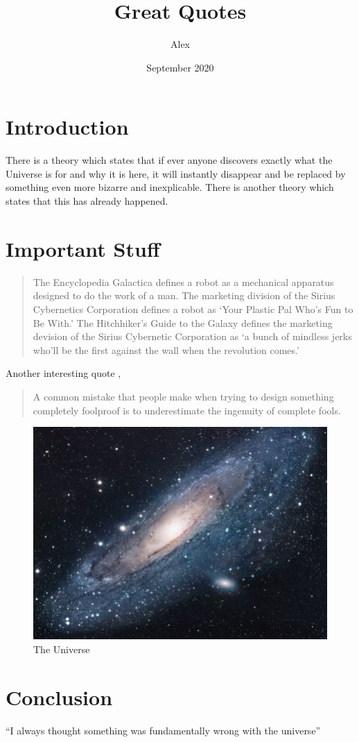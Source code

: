 \documentclass{article}
\title{Great Quotes}
\author{Alex}
\date{September 2020}
\begin{document}
\maketitle

\section{Introduction}
There is a theory which states that if ever anyone discovers exactly what the Universe is for and why it is here, it will instantly disappear and be replaced by something even more bizarre and inexplicable.
There is another theory which states that this has already happened.

\section{Important Stuff}

\begin{quote}
The Encyclopedia Galactica defines a robot as a mechanical apparatus designed to do the work of a man. The marketing division of the Sirius Cybernetics Corporation defines a robot as `Your Plastic Pal Who's Fun to Be With.' The Hitchhiker's Guide to the Galaxy defines the marketing devision of the Sirius Cybernetic Corporation as `a bunch of mindless jerks who'll be the first against the wall when the revolution comes.'
\end{quote}

Another interesting quote \cite{adams2009mostly},
\begin{quote}
A common mistake that people make when trying to design something completely foolproof is to underestimate the ingenuity of complete fools.
\end{quote}

\begin{figure}[h!]
\centering
\includegraphics[scale=1.7]{universe}
\caption{The Universe}
\label{fig:universe}
\end{figure}

\section{Conclusion}
``I always thought something was fundamentally wrong with the universe'' \citep{adams1995hitchhiker}



\end{document}
